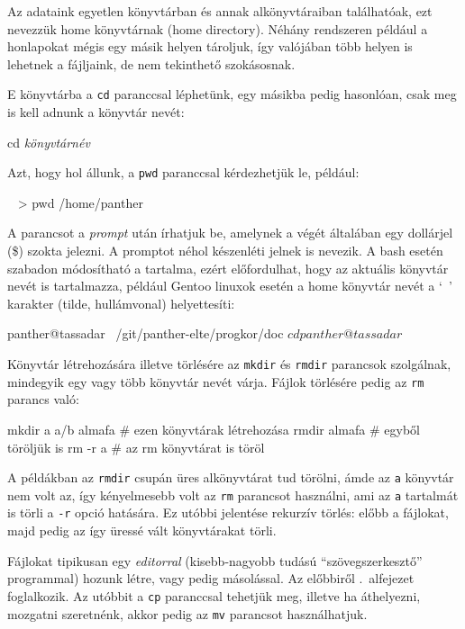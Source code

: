 Az adataink egyetlen könyvtárban és annak alkönyvtáraiban találhatóak, ezt
nevezzük home könyvtárnak (home directory). Néhány rendszeren például a
honlapokat mégis egy másik helyen tároljuk, így valójában több helyen is
lehetnek a fájljaink, de nem tekinthető szokásosnak.

E könyvtárba a \texttt{cd} paranccsal léphetünk, egy másikba pedig hasonlóan,
csak meg is kell adnunk a könyvtár nevét:
\begin{VerbExample}[commandchars=\\\{\}]
cd \textit{könyvtárnév}
\end{VerbExample}
Azt, hogy hol állunk, a \texttt{pwd} paranccsal kérdezhetjük le, például:

\begin{VerbExample}
~ > pwd
/home/panther
\end{VerbExample}

A parancsot a \emph{prompt} után írhatjuk be, amelynek a végét általában egy
dollárjel (\$) szokta jelezni. A promptot néhol készenléti jelnek is nevezik. A
bash esetén szabadon módosítható a tartalma, ezért előfordulhat, hogy az
aktuális könyvtár nevét is tartalmazza, például Gentoo linuxok esetén a home
könyvtár nevét a `~' karakter (tilde, hullámvonal) helyettesíti:

\begin{VerbExample}
panther@tassadar ~/git/panther-elte/progkor/doc $ cd
panther@tassadar ~ $
\end{VerbExample}

Könyvtár létrehozására illetve törlésére az \texttt{mkdir} és \texttt{rmdir}
parancsok szolgálnak, mindegyik egy vagy több könyvtár nevét várja. Fájlok
törlésére pedig az \texttt{rm} parancs való:

\begin{VerbExample}
mkdir a a/b almafa  # ezen könyvtárak létrehozása
rmdir almafa        # egyből töröljük is
rm -r a             # az rm könyvtárat is töröl
\end{VerbExample}

A példákban az \texttt{rmdir} csupán üres alkönyvtárat tud törölni, ámde az
\texttt{a} könyvtár nem volt az, így kényelmesebb volt az \texttt{rm} parancsot
használni, ami az \texttt{a} tartalmát is törli a \texttt{-r} opció hatására. Ez
utóbbi jelentése rekurzív törlés: előbb a fájlokat, majd pedig az így üressé
vált könyvtárakat törli.

Fájlokat tipikusan egy \emph{editorral} (kisebb-nagyobb tudású
``szövegszerkesztő'' programmal) hozunk létre, vagy pedig másolással. Az
előbbiről .\ alfejezet foglalkozik. Az utóbbit a \texttt{cp}
paranccsal tehetjük meg, illetve ha áthelyezni, mozgatni szeretnénk, akkor pedig
az \texttt{mv} parancsot használhatjuk.

